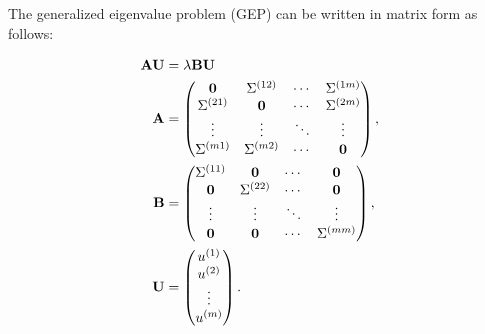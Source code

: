 The generalized eigenvalue problem (GEP) can be written in matrix form as follows:

\begin{align}
    \mathbf{A} \mathbf{U} &= \lambda \mathbf{B} \mathbf{U} \\
    \mathbf{A} &= \begin{pmatrix}
        \mathbf{0} & \Sigma^{(12)} & \cdots & \Sigma^{(1m)} \\
        \Sigma^{(21)} & \mathbf{0} & \cdots & \Sigma^{(2m)} \\
        \vdots & \vdots & \ddots & \vdots \\
        \Sigma^{(m1)} & \Sigma^{(m2)} & \cdots & \mathbf{0}
    \end{pmatrix}, \\
    \mathbf{B} &= \begin{pmatrix}
        \Sigma^{(11)} & \mathbf{0} & \cdots & \mathbf{0} \\
        \mathbf{0} & \Sigma^{(22)} & \cdots & \mathbf{0} \\
        \vdots & \vdots & \ddots & \vdots \\
        \mathbf{0} & \mathbf{0} & \cdots & \Sigma^{(mm)}
    \end{pmatrix}, \\
    \mathbf{U} &= \begin{pmatrix}
        u^{(1)} \\
        u^{(2)} \\
        \vdots \\
        u^{(m)}
    \end{pmatrix}.
\end{align}

